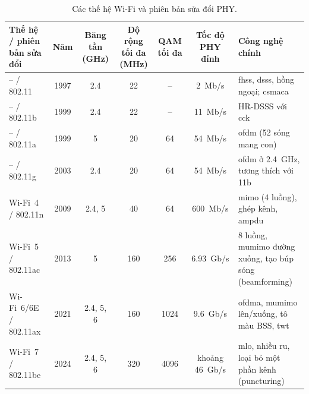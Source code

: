 \begin{table}[htbp]
  \centering\footnotesize
  \caption{Các thế hệ Wi-Fi và phiên bản sửa đổi PHY.}
  \label{tab:generations}
  \begin{tabularx}{\linewidth}{@{} L{1.1} C{0.4} C{0.6} C{0.5} C{0.4} C{0.8} L{2.2} @{}}
    \toprule
    \textbf{Thế hệ / phiên bản sửa đổi} & \textbf{Năm} & \textbf{Băng tần (GHz)} & \textbf{Độ rộng tối đa (MHz)} & \textbf{QAM tối đa} & \textbf{Tốc độ PHY đỉnh} & \textbf{Công nghệ chính} \\
    \midrule
    -- / 802.11                     & 1997          & 2.4                  & 22                       & --               & 2~Mb/s                 & \acs{fhss}, \acs{dsss}, hồng ngoại; \acs{csmaca} \\
    -- / 802.11b                    & 1999          & 2.4                  & 22                       & --               & 11~Mb/s                & HR-DSSS với \acs{cck} \\
    -- / 802.11a                    & 1999          & 5                    & 20                       & 64               & 54~Mb/s                & \acs{ofdm} (52 sóng mang con) \\
    -- / 802.11g                    & 2003          & 2.4                  & 20                       & 64               & 54~Mb/s                & \acs{ofdm} ở 2.4~GHz, tương thích với 11b \\
    Wi-Fi~4 / 802.11n               & 2009          & 2.4, 5               & 40                       & 64               & 600~Mb/s               & \acs{mimo} (4 luồng), ghép kênh, \acs{ampdu} \\
    Wi-Fi~5 / 802.11ac              & 2013          & 5                    & 160                      & 256              & 6.93~Gb/s              & 8 luồng, \acs{mumimo} đường xuống, tạo búp sóng (beamforming) \\
    Wi-Fi~6/6E / 802.11ax           & 2021          & 2.4, 5, 6            & 160                      & 1024             & 9.6~Gb/s               & \acs{ofdma}, \acs{mumimo} lên/xuống, tô màu BSS, \acs{twt} \\
    Wi-Fi~7 / 802.11be              & 2024          & 2.4, 5, 6            & 320                      & 4096             & khoảng 46~Gb/s         & \acs{mlo}, nhiều \acs{ru}, loại bỏ một phần kênh (puncturing) \\
    \bottomrule
  \end{tabularx}
\end{table}

